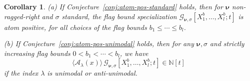 \documentclass[12pt]{amsart}
\newtheorem{cor}[thm]{Corollary}
\theoremstyle{definition}
\theoremstyle{remark}
\newcommand{\NN}{{\mathbb N}}
\newcommand{\nubold}{{\boldsymbol \nu }}
\newcommand{\Acal}{{\mathcal A}}
\newcommand{\Gcal}{{\mathcal G}}
\begin{document}
\begin{cor}\label{cor:atom-pos}
(a) If Conjecture~\ref{conj:atom-pos-standard} holds, then for $\nubold $
non-ragged-right and $\sigma $ standard, the flag bound
specialization $\Gcal _{\nubold ,\sigma }[X^{b}_{1},\ldots,X^{b}_{l};
t]$ is atom positive, for all choices of the flag bounds $b_{1}\leq
\cdots \leq b_{l}$.

(b) If Conjecture~\ref{conj:atom-pos-unimodal} holds, then for any
$\nubold ,\sigma $ and strictly increasing flag bounds $0<b_{1}<\cdots <b_{l}$,
we have
\begin{equation}\label{e:atom-pos-unimodal-cor}
\langle \Acal _{\lambda }(x) \rangle\, \Gcal _{\nubold ,\sigma
}[X^{b}_{1},\ldots,X^{b}_{l}; t] \in \NN [t]
\end{equation}
if the index $\lambda $ is unimodal or anti-unimodal.
\end{cor}
\end{document}
